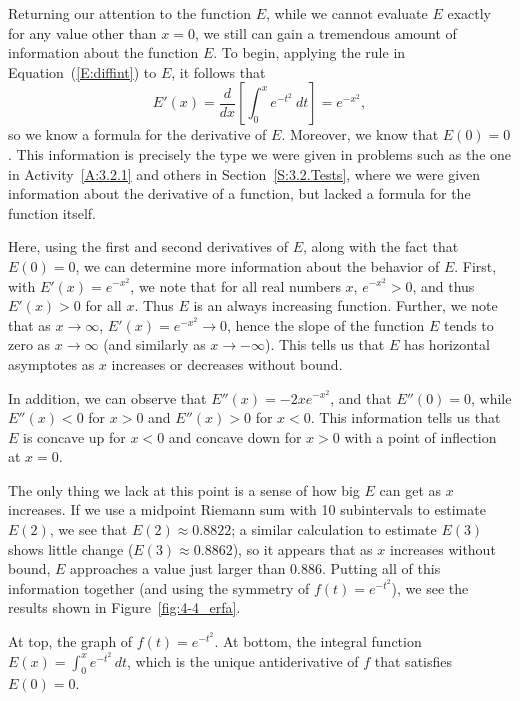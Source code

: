 Returning our attention to the function $E$, while we cannot evaluate $E$ exactly for any value other than $x = 0$, 
we still can gain a tremendous amount of information about the function $E$.  To begin, applying the rule in Equation~(\ref{E:diffint}) to $E$, it follows that
\[ E'(x) = \frac{d}{dx} \left[ \int_0^x e^{-t^2} \ dt \right] = e^{-x^2}, \]
so we know a formula for the derivative of $E$.  Moreover, we know that $E(0) = 0$.  This information is precisely the type we were given in problems such as the one in Activity~\ref{A:3.2.1} and others in Section~\ref{S:3.2.Tests}, where we were given information about the derivative of a function, but lacked a formula for the function itself.  

Here, using the first and second derivatives of $E$, along with the fact that $E(0) = 0$, we can determine more information about the behavior of $E$.  First, with $E'(x) = e^{-x^2}$, we note that for all real numbers $x$, $e^{-x^2} > 0$, and thus $E'(x) > 0$ for all $x$.  Thus $E$ is an always increasing function.  Further, we note that as $x \to \infty$, $E'(x) = e^{-x^2} \to 0$, hence the slope of the function $E$ tends to zero as $x \to \infty$ (and similarly as $x \to -\infty$).  This tells us that $E$ has horizontal asymptotes as $x$ increases or decreases without bound. 

In addition, we can observe that $E''(x) = -2xe^{-x^2}$, and that $E''(0) = 0$, while $E''(x) < 0$ for $x > 0$ and $E''(x) > 0$ for $x < 0$.  This information tells us that $E$ is concave up for $x<0$ and concave down for $x > 0$ with a point of inflection at $x = 0$.  

The only thing we lack at this point is a sense of how big $E$ can get as $x$ increases.  If we use a midpoint Riemann sum with 10 subintervals to estimate $E(2)$, we see that $E(2) \approx 0.8822$; a similar calculation to estimate $E(3)$ shows little change ($E(3) \approx 0.8862$), so it appears that as $x$ increases without bound, $E$ approaches a value just larger than $0.886$.  Putting all of this information together (and using the symmetry of $f(t) = e^{-t^2}$), we see the results shown in Figure~\ref{fig:4-4_erfa}.

\begin{marginfigure}[-4cm] %
\captionsetup[subfigure]{labelformat=empty}

\caption{At top, the graph of $f(t) = e^{-t^2}$.  At bottom, the integral function $E(x) = \int_0^x e^{-t^2} \,dt$, which is the unique antiderivative of $f$ that satisfies $E(0) = 0$.} \label{fig:4-4_erfa}
\end{marginfigure}


